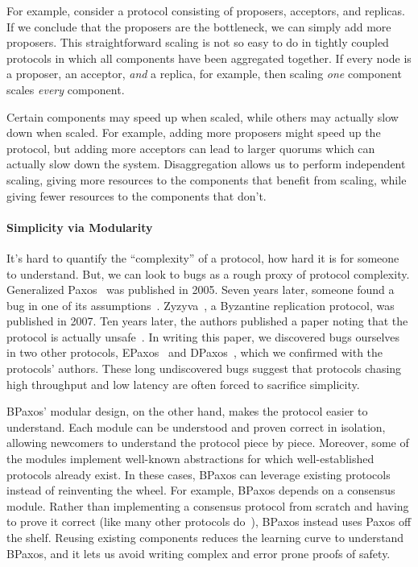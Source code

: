 For example, consider a protocol consisting of proposers, acceptors, and
replicas. If we conclude that the proposers are the bottleneck, we can simply
add more proposers. This straightforward scaling is not so easy to do in
tightly coupled protocols in which all components have been aggregated
together. If every node is a proposer, an acceptor, \emph{and} a replica, for
example, then scaling \emph{one} component scales \emph{every} component.

Certain components may speed up when scaled, while others may actually slow
down when scaled.  For example, adding more proposers might speed up the
protocol, but adding more acceptors can lead to larger quorums which can
actually slow down the system. Disaggregation allows us to perform independent
scaling, giving more resources to the components that benefit from scaling,
while giving fewer resources to the components that don't.

\paragraph{Simplicity via Modularity}
It's hard to quantify the ``complexity'' of a protocol, how hard it is for
someone to understand. But, we can look to bugs as a rough proxy of protocol
complexity. Generalized Paxos~\cite{lamport2005generalized} was published in
2005. Seven years later, someone found a bug in one of its
assumptions~\cite{sutra2011fast}.  Zyzyva~\cite{kotla2007zyzzyva}, a Byzantine
replication protocol, was published in 2007. Ten years later, the authors
published a paper noting that the protocol is actually
unsafe~\cite{abraham2017revisiting}. In writing this paper, we discovered bugs
ourselves in two other protocols, EPaxos~\cite{moraru2013there} and
DPaxos~\cite{nawab2018dpaxos}, which we confirmed with the protocols' authors.
These long undiscovered bugs suggest that protocols chasing high throughput and
low latency are often forced to sacrifice simplicity.

BPaxos' modular design, on the other hand, makes the protocol easier to
understand. Each module can be understood and proven correct in isolation,
allowing newcomers to understand the protocol piece by piece. Moreover, some of
the modules implement well-known abstractions for which well-established
protocols already exist. In these cases, BPaxos can leverage existing protocols
instead of reinventing the wheel. For example, BPaxos depends on a consensus
module. Rather than implementing a consensus protocol from scratch and having
to prove it correct (like many other protocols do~\cite{moraru2013there,
arun2017speeding, nawab2018dpaxos}), BPaxos instead uses Paxos off the shelf.
Reusing existing components reduces the learning curve to understand BPaxos,
and it lets us avoid writing complex and error prone proofs of safety.

